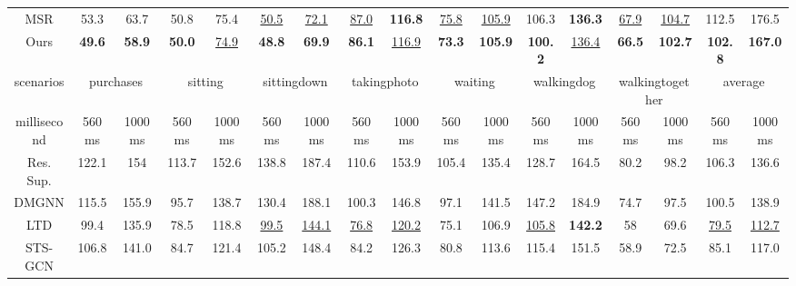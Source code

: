 \begin{table}[h]
{\begin{tabular}{c|cc|cc|cc|cc|cc|cc|cc|cc}
        MSR   & 53.3          & 63.7           & 50.8          & 75.4           & \underline{50.5}           & \underline{72.1}           & \underline{87.0}           & \textbf{116.8} & \underline{75.8}          & \underline{105.9}          & 106.3          & \textbf{136.3} & \underline{67.9}             & \underline{104.7}            & 112.5          & 176.5          \\
        Ours   & \textbf{49.6} & \textbf{58.9}  & \textbf{50.0} & \underline{74.9}           & \textbf{48.8}  & \textbf{69.9}  & \textbf{86.1}  & \underline{116.9}          & \textbf{73.3} & \textbf{105.9} & \textbf{100.2} & \underline{136.4}          & \textbf{66.5}    & \textbf{102.7}   & \textbf{102.8} & \textbf{167.0} \\ \hline
        scenarios   & \multicolumn{2}{c|}{purchases}  & \multicolumn{2}{c|}{sitting}    & \multicolumn{2}{c|}{sittingdown} & \multicolumn{2}{c|}{takingphoto} & \multicolumn{2}{c|}{waiting}    & \multicolumn{2}{c|}{walkingdog}  & \multicolumn{2}{c|}{walkingtogether} & \multicolumn{2}{c}{average}         \\ \hline
        millisecond & 560ms         & 1000ms         & 560ms         & 1000ms         & 560ms          & 1000ms         & 560ms          & 1000ms         & 560ms         & 1000ms         & 560ms          & 1000ms         & 560ms            & 1000ms           & 560ms          & 1000ms         \\ \hline
        Res. Sup.   & 122.1         & 154            & 113.7         & 152.6          & 138.8          & 187.4          & 110.6          & 153.9          & 105.4         & 135.4          & 128.7          & 164.5          & 80.2             & 98.2             & 106.3          & 136.6          \\
        DMGNN & 115.5         & 155.9          & 95.7          & 138.7          & 130.4          & 188.1          & 100.3          & 146.8          & 97.1          & 141.5          & 147.2          & 184.9          & 74.7             & 97.5             & 100.5          & 138.9          \\
        LTD   & 99.4          & 135.9          & 78.5          & 118.8          & \underline{99.5}           & \underline{144.1}          & \underline{76.8}           & \underline{120.2}          & 75.1          & 106.9          & \underline{105.8}          & \textbf{142.2} & 58               & 69.6             & \underline{79.5}           & \underline{112.7}          \\
        STS-GCN              & 106.8                & 141.0                & 84.7                 & 121.4                & 105.2                & 148.4                & 84.2                 & 126.3                & 80.8                 & 113.6                & 115.4                & 151.5                & 58.9                 & 72.5                 & 85.1                 & 117.0         \\

\end{tabular}}
\end{table}
